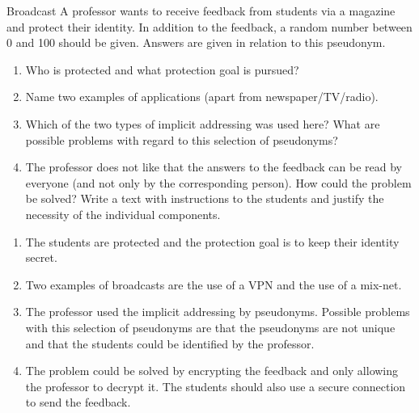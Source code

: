 \documentclass{article}
\begin{document}
\begin{exercise}{Broadcast}
  A professor wants to receive feedback from students via a magazine and protect their identity. In addition to the feedback, a random number between 0 and 100 should be given. Answers are given in relation to this pseudonym.
  \begin{enumerate}
    \item Who is protected and what protection goal is pursued?
    \item Name two examples of applications (apart from newspaper/TV/radio).
    \item Which of the two types of implicit addressing was used here? What are possible problems with regard to this selection of pseudonyms?
    \item The professor does not like that the answers to the feedback can be read by everyone (and not only by the corresponding person). How could the problem be solved? Write a text with instructions to the students and justify the necessity of the individual components.
  \end{enumerate}

  \begin{solution}
    \begin{enumerate}
      \item The students are protected and the protection goal is to keep their identity secret.
      \item Two examples of broadcasts are the use of a VPN and the use of a mix-net.
      \item The professor used the implicit addressing by pseudonyms. Possible problems with this selection of pseudonyms are that the pseudonyms are not unique and that the students could be identified by the professor.
      \item The problem could be solved by encrypting the feedback and only allowing the professor to decrypt it. The students should also use a secure connection to send the feedback.
    \end{enumerate}
  \end{solution}
\end{exercise}
\end{document}
